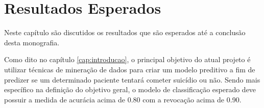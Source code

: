 \chapter{Resultados Esperados}

Neste capítulo são discutidos os resultados que são esperados até a conclusão desta monografia.

Como dito no capítulo \ref{cap:introducao}, o principal objetivo do atual projeto é utilizar técnicas de mineração de dados para criar um modelo preditivo a fim de predizer se um determinado paciente tentará cometer suicídio ou não. Sendo mais específico na definição do objetivo geral, o modelo de classificação esperado deve possuir a medida de acurácia acima de 0.80 com a revocação acima de 0.90.